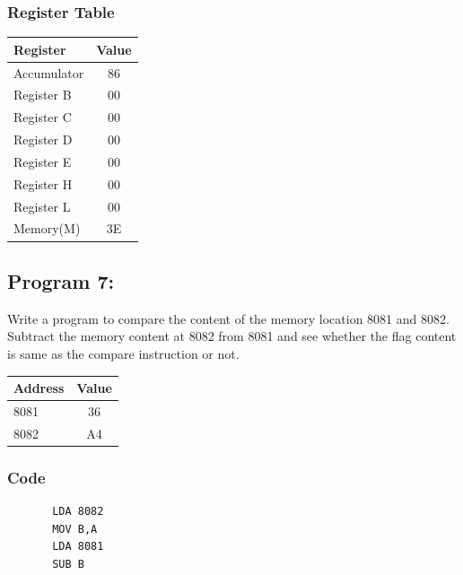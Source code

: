 \documentclass[]{report}
\begin{document}
\subsubsection {Register Table}
\begin{tabular}{lc}
    \hline
    Register & Value\\
    \hline
    Accumulator     & 86        \\
    Register B      &  00        \\
    Register C      &  00        \\
    Register D      &   00       \\
    Register E      &   00       \\
    Register H      &  00        \\
    Register L      &  00         \\
    Memory(M)       &      3E         \\
    \hline

\end{tabular}


\vspace{10mm}
\subsection*{Program 7: }
Write a program to compare the content of the memory location 8081 and 8082. Subtract the memory content at 8082 from 8081 and see whether the flag content is same as the compare instruction or not.\\
\begin{tabular}{lc}
    \hline
    Address & Value  \\
    \hline
    8081       &      36         \\
    8082 & A4 \\
    \hline
\end{tabular}
\subsubsection{Code}
\begin{verbatim}
	   LDA 8082
	   MOV B,A
	   LDA 8081
	   SUB B
\end{verbatim}
\end{document}
